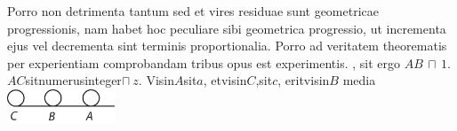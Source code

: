 Porro non detrimenta tantum sed et vires residuae sunt geometricae progressionis, nam habet hoc peculiare sibi geometrica progressio, ut incrementa ejus vel decrementa sint terminis proportionalia.
Porro ad veritatem theorematis per experientiam comprobandam tribus opus est experimentis. %
,
sit ergo $\displaystyle AB \, \sqcap \, 1$.
$\displaystyle AC$\hfill sit\hfill numerus\hfill integer\hfill $\displaystyle \sqcap \ z$.\hfill
Vis\hfill in\hfill $\displaystyle A$\hfill sit\hfill $\displaystyle a$,\hfill
et\hfill vis\hfill in\hfill $\displaystyle C$,\hfill sit\hfill $\displaystyle c$,\hfill
erit\hfill vis\hfill in\hfill $\displaystyle B$\hfill
{}\hfill
media
\pend
\newpage
\pstart
\noindent
\centering
\includegraphics[trim = 0mm -3mm 0mm 0mm, clip, width=0.24\textwidth]{images/lh03705_010v-d2.pdf}\pend
\pstart
{}
